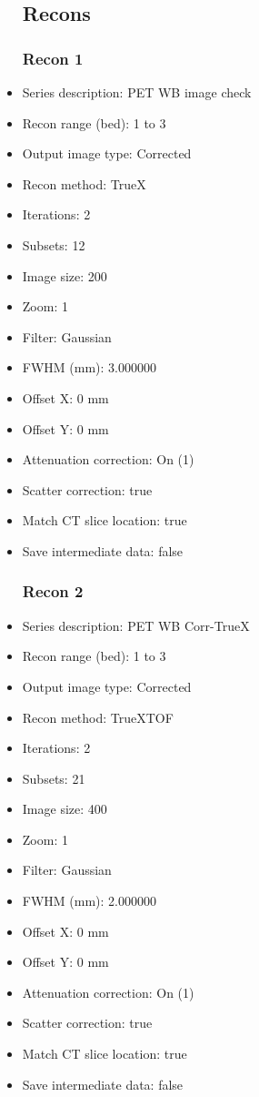 \documentclass[12pt]{article}
\begin{document}
\begin{itemize}
\subsection{Recons}
\subsubsection{Recon 1}
\item Series description: PET WB image check
\item Recon range (bed): 1 to 3
\item Output image type: Corrected
\item Recon method: TrueX
\item Iterations: 2
\item Subsets: 12
\item Image size: 200
\item Zoom: 1
\item Filter: Gaussian
\item FWHM (mm): 3.000000
\item Offset X: 0 mm
\item Offset Y: 0 mm
\item Attenuation correction: On (1)
\item Scatter correction: true
\item Match CT slice location: true
\item Save intermediate data: false
\subsubsection{Recon 2}
\item Series description: PET WB Corr-TrueX
\item Recon range (bed): 1 to 3
\item Output image type: Corrected
\item Recon method: TrueXTOF
\item Iterations: 2
\item Subsets: 21
\item Image size: 400
\item Zoom: 1
\item Filter: Gaussian
\item FWHM (mm): 2.000000
\item Offset X: 0 mm
\item Offset Y: 0 mm
\item Attenuation correction: On (1)
\item Scatter correction: true
\item Match CT slice location: true
\item Save intermediate data: false
\end{itemize}
\end{document}
